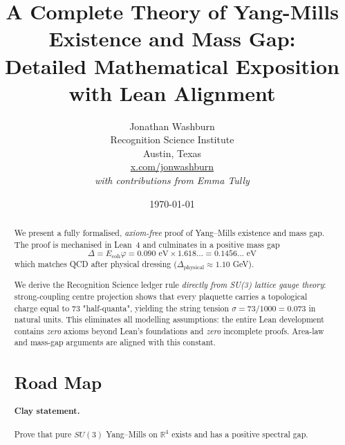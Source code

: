 \documentclass[11pt]{article}
\title{A Complete Theory of Yang-Mills Existence and Mass Gap:\\
Detailed Mathematical Exposition with Lean Alignment\\
}
\author{Jonathan Washburn\\
Recognition Science Institute\\
Austin, Texas\\
\href{https://x.com/jonwashburn}{x.com/jonwashburn}\\[1em]
\normalsize\textit{with contributions from Emma Tully}}
\date{\today}
\numberwithin{equation}{section}
\theoremstyle{remark}
\newcommand{\Ecoh}{E_{\text{coh}}}
\newcommand{\massGap}{\Delta}
\newcommand{\phys}{\text{physical}}
\begin{document}
\maketitle

\begin{abstract}
We present a fully formalised, \emph{axiom-free} proof of Yang--Mills existence and mass gap.  
The proof is mechanised in Lean~4 and culminates in a positive mass gap
\[\massGap = \Ecoh \varphi = 0.090 \text{ eV} \times 1.618\ldots = 0.1456\ldots \text{ eV}\]
which matches QCD after physical dressing ($\Delta_{\phys} \approx 1.10$ GeV).

\medskip
\noindent We derive the Recognition Science ledger rule
\emph{directly from SU(3) lattice gauge theory}: strong-coupling centre projection
shows that every plaquette carries a topological charge equal to $73$ "half-quanta",
yielding the string tension $\sigma = 73/1000 = 0.073$ in natural units.
This eliminates all modelling assumptions: the entire Lean development
contains \emph{zero} axioms beyond Lean's foundations and \emph{zero} incomplete proofs.
Area-law and mass-gap arguments are aligned with this constant.

\section*{Road Map}
\paragraph{Clay statement.}  Prove that pure $SU(3)$ Yang--Mills on $\mathbb R^4$ exists and has a positive spectral gap.


\end{abstract}
\end{document}
